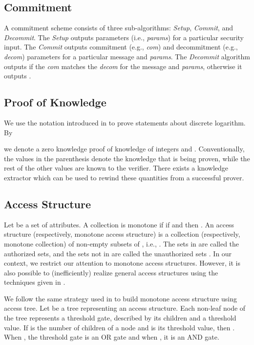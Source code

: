 \documentclass[10pt,journal]{IEEEtran}
\begin{document}
\subsection{Commitment}
A commitment scheme consists of three sub-algorithms: \textit{Setup}, \textit{Commit}, and \textit{Decommit}. The \textit{Setup} outputs parameters (i.e., \textit{params}) for a particular security input. The \textit{Commit} outputs commitment (e.g., \textit{com}) and decommitment (e.g., \textit{decom}) parameters for a particular message  and \textit{params}. The \textit{Decommit} algorithm outputs  if the \textit{com} matches the \textit{decom} for the message and \textit{params}, otherwise it outputs .

\subsection{Proof of Knowledge}
We use the notation introduced in \cite{PoK} to prove statements about discrete logarithm. By

we denote a zero knowledge proof of knowledge of integers  and . Conventionally, the values in the parenthesis
denote the knowledge that is being proven, while the rest of the other values are known to the verifier. There exists a knowledge extractor which can be used to rewind these quantities from a successful prover.


\subsection{Access Structure}
Let  be a set of attributes. A collection  is monotone if  if  and  then . An access structure (respectively, monotone access structure) is a collection (respectively, monotone collection)  of non-empty subsets of , i.e., . The sets in  are called the authorized sets, and the sets not in  are called the unauthorized sets \cite{Beimel}. In our context, we restrict our attention to monotone access structures. However, it is also possible to (inefficiently) realize general access structures using the techniques given in \cite{kpabe}.

We follow the same strategy used in \cite{kpabe} to build monotone access structure using access tree. Let  be a tree representing an access structure. Each non-leaf node of the tree represents a threshold gate, described by its children and a threshold value. If 
is the number of children of a node  and  is its threshold value, then . When , the threshold gate is an OR gate and when , it is an AND gate.
\end{document}
